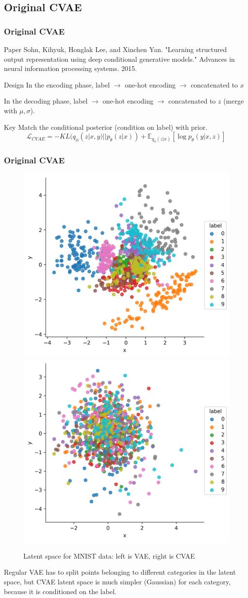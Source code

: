 \documentclass{beamer}
\begin{document}
\subsection{Original CVAE}
\begin{frame}
\frametitle{Original CVAE}
\begin{block}{Paper}
Sohn, Kihyuk, Honglak Lee, and Xinchen Yan. "Learning structured output representation using deep conditional generative models." Advances in neural information processing systems. 2015.
\end{block}

\begin{block}{Design}
In the encoding phase, label $\rightarrow$ one-hot encoding $\rightarrow$ concatenated to $x$ 

In the decoding phase, label $\rightarrow$ one-hot encoding $\rightarrow$ concatenated to $z$ (merge with $\mu,\sigma$).
\end{block}

\begin{block}{Key}
Match the conditional posterior (condition on label) with prior.
\[
\mathcal{L}_{CVAE} = -KL(q_\phi(z|x, y)||p_\theta(z|x)) + \mathbb{E}_{q_\phi(z|x)}[\log p_\theta(y|x, z)]
\]
\end{block}
\end{frame}

\begin{frame}
\frametitle{Original CVAE}

\begin{figure}
\includegraphics[width=0.45\linewidth]{figs/cvae_vae.png}
\includegraphics[width=0.45\linewidth]{figs/cvae_cvae.png}
\caption{Latent space for MNIST data: left is VAE, right is CVAE}
\end{figure}

Regular VAE has to split points belonging to different categories in the latent space, but CVAE latent space is much simpler (Gaussian) for each category, because it is conditioned on the label.

\end{frame}
\end{document}
